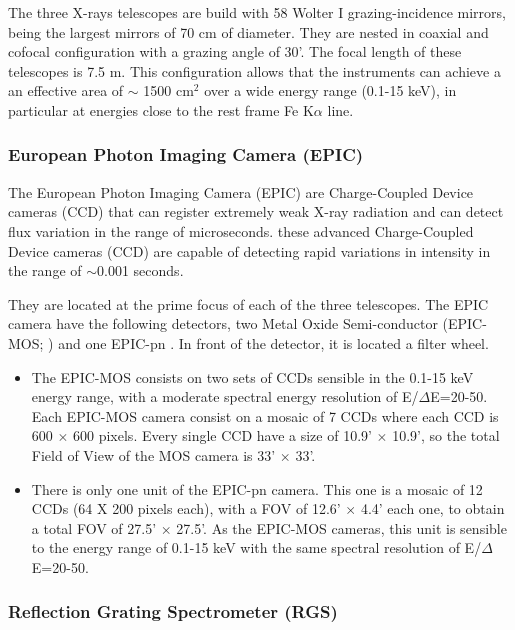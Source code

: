 The three X-rays telescopes are build with 58 Wolter I grazing-incidence mirrors, being the largest mirrors of 70 cm of diameter. They are nested in coaxial and cofocal configuration with a grazing angle of 30'. The focal length of these telescopes is 7.5 m. This configuration allows that the instruments can achieve a an effective area of $\sim$ 1500 cm$^{2}$ over a wide energy range (0.1-15 keV), in particular at energies close to the rest frame Fe K$\alpha$ line.


\subsubsection{European Photon Imaging Camera (EPIC)}
\label{sec2:epic}


The European Photon Imaging Camera (EPIC) are Charge-Coupled Device cameras (CCD) that can register extremely weak X-ray radiation and can detect flux variation in the range of microseconds. these advanced Charge-Coupled Device cameras (CCD) are capable of detecting rapid variations in intensity in the range of $\sim$0.001 seconds.


They are located at the prime focus of each of the three telescopes. The EPIC camera have the following detectors, two Metal Oxide Semi-conductor (EPIC-MOS; \citealt{turner01}) and one EPIC-pn \citep{struder01}. In front of the detector, it is located a filter wheel.

\begin{itemize}

\item The EPIC-MOS consists on two sets of CCDs sensible in the 0.1-15 keV energy range, with a moderate spectral energy resolution of E/$\Delta$E=20-50. Each EPIC-MOS camera consist on a mosaic of 7 CCDs where each CCD is 600 $\times$ 600 pixels. Every single CCD have a size of 10.9' $\times$ 10.9', so the total Field of View of the MOS camera is 33' $\times$ 33'.

\item There is only one unit of the EPIC-pn camera. This one is a mosaic of  12 CCDs (64 X 200 pixels each), with a FOV of 12.6' $\times$ 4.4' each one, to obtain a total FOV of 27.5' $\times$ 27.5'. As the EPIC-MOS cameras, this unit is sensible to the energy range of 0.1-15 keV with the same spectral resolution of E/$\Delta$E=20-50.

\end{itemize}


\subsubsection{Reflection Grating Spectrometer (RGS)}
\label{sec2:rgs}


